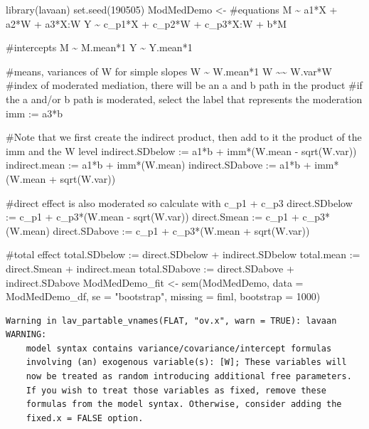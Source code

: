 \documentclass[
  11pt,
]{book}
\newenvironment{Shaded}{\begin{snugshade}}{\end{snugshade}}
\newcommand{\AttributeTok}[1]{\textcolor[rgb]{0.77,0.63,0.00}{#1}}
\newcommand{\DecValTok}[1]{\textcolor[rgb]{0.00,0.00,0.81}{#1}}
\newcommand{\FunctionTok}[1]{\textcolor[rgb]{0.00,0.00,0.00}{#1}}
\newcommand{\NormalTok}[1]{#1}
\newcommand{\OtherTok}[1]{\textcolor[rgb]{0.56,0.35,0.01}{#1}}
\newcommand{\StringTok}[1]{\textcolor[rgb]{0.31,0.60,0.02}{#1}}
\begin{document}
\begin{Shaded}
\begin{Highlighting}[]
\FunctionTok{library}\NormalTok{(lavaan)}
\FunctionTok{set.seed}\NormalTok{(}\DecValTok{190505}\NormalTok{)}
\NormalTok{ModMedDemo }\OtherTok{\textless{}{-}} \StringTok{\textquotesingle{}}
\StringTok{    \#equations}
\StringTok{    M \textasciitilde{} a1*X + a2*W + a3*X:W}
\StringTok{    Y \textasciitilde{} c\_p1*X + c\_p2*W + c\_p3*X:W + b*M}

\StringTok{    \#intercepts}
\StringTok{    M \textasciitilde{} M.mean*1}
\StringTok{    Y \textasciitilde{} Y.mean*1}

\StringTok{    \#means, variances of W for simple slopes}
\StringTok{    W \textasciitilde{} W.mean*1}
\StringTok{    W \textasciitilde{}\textasciitilde{} W.var*W}
\StringTok{    }
\StringTok{    \#index of moderated mediation, there will be an a and b path in the product}
\StringTok{    \#if the a and/or b path is moderated, select the label that represents the moderation}
\StringTok{    imm := a3*b}

\StringTok{    \#Note that we first create the indirect product, then add to it the product of the imm and the W level}
\StringTok{    indirect.SDbelow := a1*b + imm*(W.mean {-} sqrt(W.var))}
\StringTok{    indirect.mean := a1*b + imm*(W.mean)}
\StringTok{    indirect.SDabove := a1*b + imm*(W.mean + sqrt(W.var))}

\StringTok{    \#direct effect is also moderated so calculate with c\_p1 + c\_p3}
\StringTok{    direct.SDbelow := c\_p1 + c\_p3*(W.mean {-} sqrt(W.var)) }
\StringTok{    direct.Smean := c\_p1 + c\_p3*(W.mean)}
\StringTok{    direct.SDabove := c\_p1 + c\_p3*(W.mean + sqrt(W.var))}

\StringTok{    \#total effect}
\StringTok{    total.SDbelow := direct.SDbelow + indirect.SDbelow}
\StringTok{    total.mean := direct.Smean + indirect.mean}
\StringTok{    total.SDabove := direct.SDabove + indirect.SDabove}
\StringTok{ \textquotesingle{}}
\NormalTok{ModMedDemo\_fit }\OtherTok{\textless{}{-}} \FunctionTok{sem}\NormalTok{(ModMedDemo, }\AttributeTok{data =}\NormalTok{ ModMedDemo\_df, }\AttributeTok{se =} \StringTok{"bootstrap"}\NormalTok{, }\AttributeTok{missing =} \StringTok{\textquotesingle{}fiml\textquotesingle{}}\NormalTok{, }\AttributeTok{bootstrap =} \DecValTok{1000}\NormalTok{)}
\end{Highlighting}
\end{Shaded}

\begin{verbatim}
Warning in lav_partable_vnames(FLAT, "ov.x", warn = TRUE): lavaan WARNING:
    model syntax contains variance/covariance/intercept formulas
    involving (an) exogenous variable(s): [W]; These variables will
    now be treated as random introducing additional free parameters.
    If you wish to treat those variables as fixed, remove these
    formulas from the model syntax. Otherwise, consider adding the
    fixed.x = FALSE option.
\end{verbatim}
\end{document}
